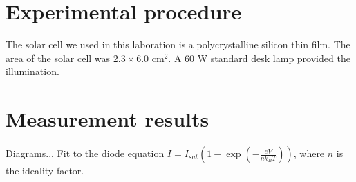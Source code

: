 \documentclass[a4paper]{article}
\begin{document}
\section{Experimental procedure}

The solar cell we used in this laboration is a polycrystalline silicon thin film. The area of the solar cell was $2.3 \times 6.0$ cm$^2$. A $60$ W standard desk lamp provided the illumination.

\section{Measurement results}

Diagrams... Fit to the diode equation $I = I_{sat}\left(1-\exp\left(-\frac{eV}{nk_BT}\right)\right)$, where $n$ is the ideality factor.
\end{document}
